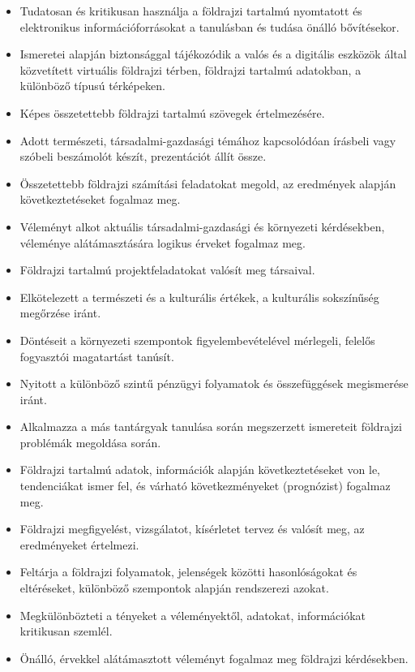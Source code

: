 \begin{itemize}
\item
  Tudatosan és kritikusan használja a földrajzi tartalmú nyomtatott és
  elektronikus információforrásokat a tanulásban és tudása önálló
  bővítésekor.
\item
  Ismeretei alapján biztonsággal tájékozódik a valós és a digitális
  eszközök által közvetített virtuális földrajzi térben, földrajzi
  tartalmú adatokban, a különböző típusú térképeken.
\item
  Képes összetettebb földrajzi tartalmú szövegek értelmezésére.
\item
  Adott természeti, társadalmi-gazdasági témához kapcsolódóan írásbeli
  vagy szóbeli beszámolót készít, prezentációt állít össze.
\item
  Összetettebb földrajzi számítási feladatokat megold, az eredmények
  alapján következtetéseket fogalmaz meg.
\item
  Véleményt alkot aktuális társadalmi-gazdasági és környezeti
  kérdésekben, véleménye alátámasztására logikus érveket fogalmaz meg.
\item
  Földrajzi tartalmú projektfeladatokat valósít meg társaival.
\item
  Elkötelezett a természeti és a kulturális értékek, a kulturális
  sokszínűség megőrzése iránt.
\item
  Döntéseit a környezeti szempontok figyelembevételével mérlegeli,
  felelős fogyasztói magatartást tanúsít.
\item
  Nyitott a különböző szintű pénzügyi folyamatok és összefüggések
  megismerése iránt.
\item
  Alkalmazza a más tantárgyak tanulása során megszerzett ismereteit
  földrajzi problémák megoldása során.
\item
  Földrajzi tartalmú adatok, információk alapján következtetéseket von
  le, tendenciákat ismer fel, és várható következményeket (prognózist)
  fogalmaz meg.
\item
  Földrajzi megfigyelést, vizsgálatot, kísérletet tervez és valósít meg,
  az eredményeket értelmezi.
\item
  Feltárja a földrajzi folyamatok, jelenségek közötti hasonlóságokat és
  eltéréseket, különböző szempontok alapján rendszerezi azokat.
\item
  Megkülönbözteti a tényeket a véleményektől, adatokat, információkat
  kritikusan szemlél.
\item
  Önálló, érvekkel alátámasztott véleményt fogalmaz meg földrajzi
  kérdésekben.

\end{itemize}
